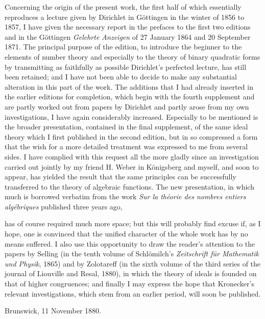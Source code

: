 \documentclass[11pt]{article}
\newcommand{\origpage}[1]{\par\vspace{0.25em}\noindent{\footnotesize\itshape [Printed page #1]}\par\vspace{0.25em}}
\begin{document}
Concerning the origin of the present work, the first half of which essentially reproduces a lecture given by Dirichlet in Göttingen in the winter of 1856 to 1857, I have given the necessary report in the prefaces to the first two editions and in the Göttingen \textit{Gelehrte Anzeigen} of 27 January 1864 and 20 September 1871. The principal purpose of the edition, to introduce the beginner to the elements of number theory and especially to the theory of binary quadratic forms by transmitting as faithfully as possible Dirichlet's perfected lecture, has still been retained; and I have not been able to decide to make any substantial alteration in this part of the work. The additions that I had already inserted in the earlier editions for completion, which begin with the fourth supplement and are partly worked out from papers by Dirichlet and partly arose from my own investigations, I have again considerably increased. Especially to be mentioned is the broader presentation, contained in the final supplement, of the same ideal theory which I first published in the second edition, but in so compressed a form that the wish for a more detailed treatment was expressed to me from several sides. I have complied with this request all the more gladly since an investigation carried out jointly by my friend H. Weber in Königsberg and myself, and soon to appear, has yielded the result that the same principles can be successfully transferred to the theory of algebraic functions. The new presentation, in which much is borrowed verbatim from the work \textit{Sur la théorie des nombres entiers algébriques} published three years ago,

\origpage{425}
has of course required much more space; but this will probably find excuse if, as I hope, one is convinced that the unified character of the whole work has by no means suffered. I also use this opportunity to draw the reader's attention to the papers by Selling (in the tenth volume of Schlömilch's \textit{Zeitschrift für Mathematik und Physik}, 1865) and by Zolotareff (in the sixth volume of the third series of the journal of Liouville and Resal, 1880), in which the theory of ideals is founded on that of higher congruences; and finally I may express the hope that Kronecker's relevant investigations, which stem from an earlier period, will soon be published.

\begin{flushleft}Brunswick, 11 November 1880.\end{flushleft}

\origpage{426}
\end{document}
